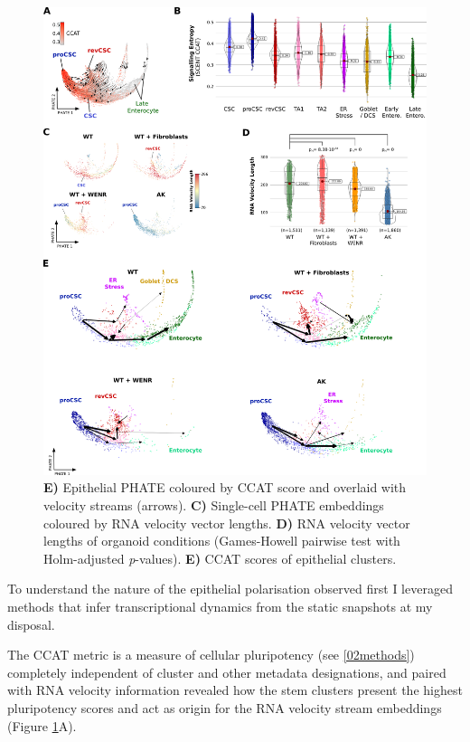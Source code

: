 \begin{figure}
    \centering
    \includegraphics{04seq/figs/4SEQ_Dynamics.png}
    \caption{\textbf{E)} Epithelial PHATE coloured by CCAT score and overlaid with velocity streams (arrows). \textbf{C)} Single-cell PHATE embeddings coloured by RNA velocity vector lengths. \textbf{D)} RNA velocity vector lengths of organoid conditions (Games-Howell pairwise test with Holm-adjusted \textit{p}-values). \textbf{E)} CCAT scores of epithelial clusters.}
    \label{fig:4dyn}
\end{figure}

To understand the nature of the epithelial polarisation observed first I leveraged methods that infer transcriptional dynamics from the static snapshots at my disposal.

The CCAT metric is a measure of cellular pluripotency (see \ref{02methods}\cite{teschendorff_single-cell_2017}) completely independent of cluster and other metadata designations, and paired with RNA velocity information \cite{bergen_generalizing_2020} revealed how the stem clusters present the highest pluripotency scores and act as origin for the RNA velocity stream embeddings (Figure \ref{fig:4dyn}A).

